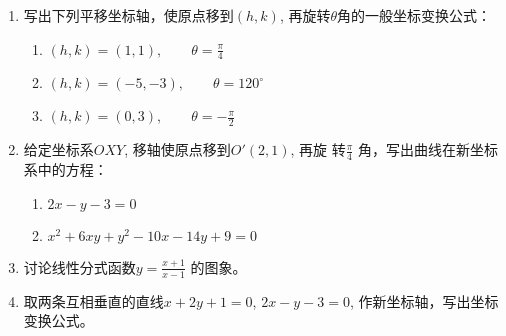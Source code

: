 \begin{example}
    
\end{example}



\begin{solution}
    
\end{solution}


\begin{ex}
\begin{enumerate}
    \item 写出下列平移坐标轴，使原点移到$(h,k)$, 再旋转$\theta$角的一般坐标变换公式：
\begin{enumerate}
    \item $(h,k)=(1,1),\qquad \theta=\frac{\pi}{4}$
    \item $(h,k)=(-5,-3),\qquad \theta=120^{\circ}$
    \item $(h,k)=(0,3),\qquad \theta=-\frac{\pi}{2}$
\end{enumerate}

\item 给定坐标系$OXY$, 移轴使原点移到$O'(2,1)$, 再旋
    转$\frac{\pi}{4}$
    角，写出曲线在新坐标系中的方程：
\begin{enumerate}
    \item $2x-y-3=0$
    \item $x^2+6xy+y^2-10x-14y+9=0$
\end{enumerate}
\item     讨论线性分式函数$y=\frac{x+1}{x-1}$
的图象。
\item 取两条互相垂直的直线$x+2y+1=0$, $2x-y-3=0$, 
作新坐标轴，写出坐标变换公式。
\end{enumerate}
\end{ex}

